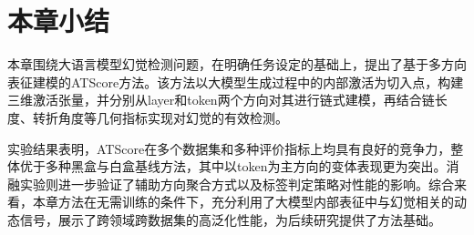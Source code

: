 \section{本章小结}

本章围绕大语言模型幻觉检测问题，在明确任务设定的基础上，提出了基于多方向表征建模的ATScore方法。该方法以大模型生成过程中的内部激活为切入点，构建三维激活张量，并分别从layer和token两个方向对其进行链式建模，再结合链长度、转折角度等几何指标实现对幻觉的有效检测。

实验结果表明，ATScore在多个数据集和多种评价指标上均具有良好的竞争力，整体优于多种黑盒与白盒基线方法，其中以token为主方向的变体表现更为突出。消融实验则进一步验证了辅助方向聚合方式以及标签判定策略对性能的影响。综合来看，本章方法在无需训练的条件下，充分利用了大模型内部表征中与幻觉相关的动态信号，展示了跨领域跨数据集的高泛化性能，为后续研究提供了方法基础。
